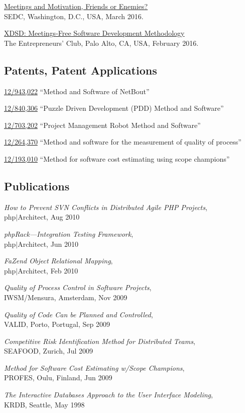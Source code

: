 \documentclass[12pt]{article}
\begin{document}
\href{https://www.youtube.com/watch?v=LB_YLWhGrco}{Meetings and Motivation, Friends or Enemies?}\\
SEDC, Washington, D.C., USA, March 2016.

\href{https://www.youtube.com/watch?v=qRZYJGYdrwk}{XDSD: Meetings-Free Software Development Methodology}\\
The Entrepreneurs' Club, Palo Alto, CA, USA, February 2016.

\subsection*{Patents, Patent Applications}

\href{https://patents.google.com/patent/US20120117164}{12/943,022}
``Method and Software of NetBout''

\href{https://patents.google.com/patent/US20120023476}{12/840,306}
``Puzzle Driven Development (PDD) Method and Software''

\href{https://patents.google.com/patent/US20110196798}{12/703,202}
``Project Management Robot Method and Software''

\href{https://patents.google.com/patent/US20100114638}{12/264,370}
``Method and software for the measurement of quality of process''

\href{https://patents.google.com/patent/US20100042968}{12/193,010}
``Method for software cost estimating using scope champions''

\subsection*{Publications}

\emph{How to Prevent SVN Conflicts in Distributed Agile PHP Projects},\\
php$|$Architect, Aug 2010

\emph{phpRack---Integration Testing Framework},\\
php$|$Architect, Jun 2010

\emph{FaZend Object Relational Mapping},\\
php$|$Architect, Feb 2010

\emph{Quality of Process Control in Software Projects},\\
IWSM/Mensura, Amsterdam, Nov 2009

\emph{Quality of Code Can be Planned and Controlled},\\
VALID, Porto, Portugal, Sep 2009

\emph{Competitive Risk Identification Method for Distributed Teams},\\
SEAFOOD, Zurich, Jul 2009

\emph{Method for Software Cost Estimating w/Scope Champions},\\
PROFES, Oulu, Finland, Jun 2009

\emph{The Interactive Databases Approach to the User Interface Modeling},\\
KRDB, Seattle, May 1998
\end{document}
